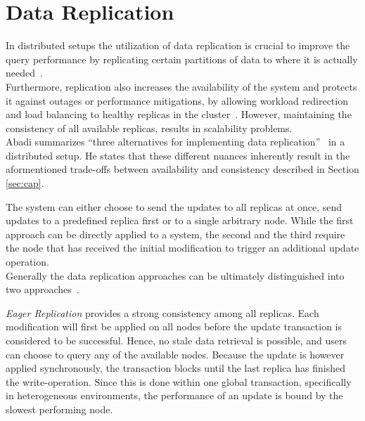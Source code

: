 


\section{Data Replication}

In distributed setups the utilization of data replication is crucial to improve the query performance
by replicating certain partitions of data to where it is actually needed~\cite{cloudpart_2012}.\\
Furthermore, replication also increases the availability of the system and protects it against outages or performance mitigations,
by allowing workload redirection and load balancing to healthy replicas in the cluster~\cite{quorums:2003}.
However, maintaining the consistency of all available replicas, results in scalability problems.\\
Abadi summarizes ``three alternatives for implementing data replication''~\cite{abadi2012} in a distributed setup.
He states that these different nuances inherently result in the aformentioned trade-offs between availability and consistency described in Section \ref{sec:cap}.

The system can either choose to send the updates to all replicas at once, send updates to a predefined replica first or to a single arbitrary node.
 While the first approach can be directly applied to a system, the second and the third require the node that has received the initial modification to trigger an additional update operation.
\\
Generally the data replication approaches can be ultimately distinguished into two approaches~\cite{gray:1996}.

\emph{Eager Replication} provides a strong consistency among all replicas. Each modification will first be applied on all nodes
before the update transaction is considered to be successful. Hence, no stale data retrieval is possible, and users can choose to query any of the available nodes.
Because the update is however applied synchronously, the transaction blocks until the last replica has finished the write-operation. 
Since this is done within one global transaction, specifically in heterogeneous environments, the performance of an update is bound by the slowest performing node.\\

